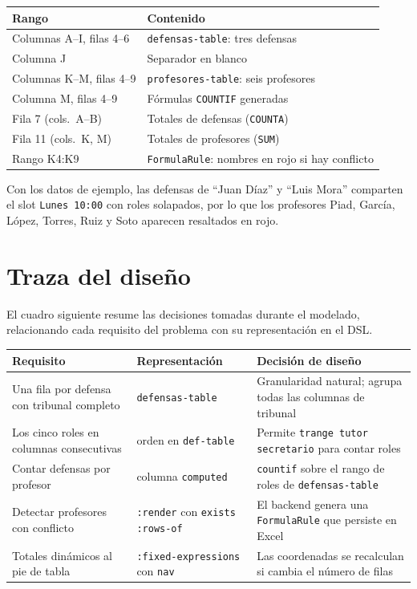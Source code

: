 \documentclass[12pt,a4paper]{report}
\begin{document}
\begin{center}
\renewcommand{\arraystretch}{1.3}
\begin{tabular}{ll}
\toprule
\textbf{Rango} & \textbf{Contenido} \\
\midrule
Columnas A--I, filas 4--6 & \texttt{defensas-table}: tres defensas \\
Columna J                 & Separador en blanco \\
Columnas K--M, filas 4--9 & \texttt{profesores-table}: seis profesores \\
Columna M, filas 4--9     & Fórmulas \texttt{COUNTIF} generadas \\
Fila 7 (cols.\ A--B)      & Totales de defensas (\texttt{COUNTA}) \\
Fila 11 (cols.\ K, M)     & Totales de profesores (\texttt{SUM}) \\
Rango K4:K9               & \texttt{FormulaRule}: nombres en rojo
                            si hay conflicto \\
\bottomrule
\end{tabular}
\end{center}

Con los datos de ejemplo, las defensas de ``Juan Díaz'' y ``Luis Mora''
comparten el slot \texttt{Lunes 10:00} con roles solapados, por lo que
los profesores Piad, García, López, Torres, Ruiz y Soto aparecen
resaltados en rojo.

\section{Traza del diseño}
\label{sec:traza}

El cuadro siguiente resume las decisiones tomadas durante el modelado,
relacionando cada requisito del problema con su representación en el DSL.

\begin{center}
\renewcommand{\arraystretch}{1.3}
\begin{tabular}{p{4.2cm}p{3.2cm}p{5.2cm}}
\toprule
\textbf{Requisito} & \textbf{Representación} & \textbf{Decisión de diseño} \\
\midrule
Una fila por defensa con tribunal completo
  & \texttt{defensas-table}
  & Granularidad natural; agrupa todas las columnas de tribunal \\
Los cinco roles en columnas consecutivas
  & orden en \texttt{def-table}
  & Permite \texttt{trange tutor secretario} para contar roles \\
Contar defensas por profesor
  & columna \texttt{computed}
  & \texttt{countif} sobre el rango de roles de \texttt{defensas-table} \\
Detectar profesores con conflicto
  & \texttt{:render} con \texttt{exists :rows-of}
  & El backend genera una \texttt{FormulaRule} que persiste en Excel \\
Totales dinámicos al pie de tabla
  & \texttt{:fixed-expressions} con \texttt{nav}
  & Las coordenadas se recalculan si cambia el número de filas \\
\bottomrule
\end{tabular}
\end{center}
\end{document}
